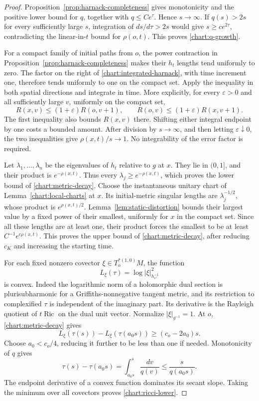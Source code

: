 \documentclass[11pt]{article}
\theoremstyle{definition}
\theoremstyle{remark}
\newcommand{\eps}{\varepsilon}
\DeclareMathOperator{\Ric}{Ric}
\numberwithin{equation}{section}
\begin{document}
\begin{proof}
Proposition~\ref{prop:harnack-completeness} gives monotonicity and
the positive lower bound for $q$, together with $q\le Ce^\tau$.
Hence $s\to\infty$.  If $q(s)>2s$ for every sufficiently large
$s$, integration of $ds/d\tau>2s$ would give
$s\ge ce^{2\tau}$, contradicting the linear-in-$t$ bound for
$\rho(o,t)$.  This proves \eqref{chart:q-growth}.

For a compact family of initial paths from $o$, the power
contraction in Proposition~\ref{prop:harnack-completeness} makes
their $h_t$ lengths tend uniformly to zero.  The factor on the
right of \eqref{chart:integrated-harnack}, with time increment
one, therefore tends uniformly to one on the compact set.  Apply
the inequality in both spatial directions and integrate in time.
More explicitly, for every $\eps>0$ and all sufficiently large
$v$, uniformly on the compact set,
\[
 R(x,v)\le(1+\eps)R(o,v+1),\qquad
 R(o,v)\le(1+\eps)R(x,v+1).
\]
The first inequality also bounds $R(x,v)$ there.  Shifting either
integral endpoint by one costs a bounded amount.  After division
by $s\to\infty$, and then letting $\eps\downarrow0$, the two
inequalities give $\rho(x,t)/s\to1$.  No integrability of the
error factor is required.

Let $\lambda_1,\ldots,\lambda_n$ be the eigenvalues of $h_t$
relative to $g$ at $x$.  They lie in $(0,1]$, and their product
is $e^{-\rho(x,t)}$.  Thus every $\lambda_j\ge e^{-\rho(x,t)}$,
which proves the lower bound of \eqref{chart:metric-decay}.
Choose the instantaneous unitary chart of
Lemma~\ref{chart:local-charts} at $x$.  Its initial-metric
singular lengths are $\lambda_j^{-1/2}$, whose product is
$e^{\rho(x,t)/2}$.  Lemma~\ref{lem:static-distortion} bounds
their largest value by a fixed power of their smallest, uniformly
for $x$ in the compact set.  Since all these lengths are at least
one, their product forces the smallest to be at least
$C^{-1}e^{c\rho(x,t)}$.  This proves the upper bound of
\eqref{chart:metric-decay}, after reducing $c_K$ and increasing
the starting time.

For each fixed nonzero covector $\xi\in T_o^{*(1,0)}M$, the
function
\[
 L_\xi(\tau)=\log|\xi|_{h_{e^\tau}^{-1}}^2
\]
is convex.  Indeed the logarithmic norm of a holomorphic dual
section is plurisubharmonic for a Griffiths-nonnegative tangent
metric, and its restriction to complexified $\tau$ is independent
of the imaginary part.  Its derivative is the Rayleigh quotient
of $t\Ric$ on the dual unit vector.  Normalize $|\xi|_{g^{-1}}=1$.
At $o$, \eqref{chart:metric-decay} gives
\[
 L_\xi(\tau(s))-L_\xi(\tau(a_0s))
 \ge(c_o-2a_0)s.
\]
Choose $a_0<c_o/4$, reducing it further to be less than one if
needed.  Monotonicity of $q$ gives
\[
 \tau(s)-\tau(a_0s)
 =\int_{a_0s}^s\frac{dv}{q(v)}
 \le\frac{s}{q(a_0s)}.
\]
The endpoint derivative of a convex function dominates its secant
slope.  Taking the minimum over all covectors proves
\eqref{chart:ricci-lower}.


\end{proof}
\end{document}
